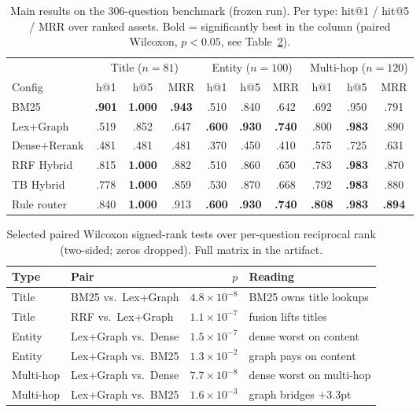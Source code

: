\documentclass[runningheads]{llncs}
\newcommand{\best}[1]{\textbf{#1}}
\begin{document}
\begin{table}[t]
\caption{Main results on the 306-question benchmark (frozen run). Per type:
hit@1 / hit@5 / MRR over ranked assets. Bold = significantly best in the
column (paired Wilcoxon, $p<0.05$, see Table~\ref{tab:sig}).}
\label{tab:main}
\centering
\footnotesize
\setlength{\tabcolsep}{3.2pt}
\begin{tabular}{l ccc ccc ccc}
\toprule
& \multicolumn{3}{c}{Title ($n{=}81$)} & \multicolumn{3}{c}{Entity ($n{=}100$)} & \multicolumn{3}{c}{Multi-hop ($n{=}120$)} \\
\cmidrule(lr){2-4}\cmidrule(lr){5-7}\cmidrule(lr){8-10}
Config & h@1 & h@5 & MRR & h@1 & h@5 & MRR & h@1 & h@5 & MRR \\
\midrule
BM25 & \best{.901} & \best{1.000} & \best{.943} & .510 & .840 & .642 & .692 & .950 & .791 \\
Lex+Graph & .519 & .852 & .647 & \best{.600} & \best{.930} & \best{.740} & .800 & \best{.983} & .890 \\
Dense+Rerank & .481 & .481 & .481 & .370 & .450 & .410 & .575 & .725 & .631 \\
RRF Hybrid & .815 & \best{1.000} & .882 & .510 & .860 & .650 & .783 & \best{.983} & .870 \\
TB Hybrid & .778 & \best{1.000} & .859 & .530 & .870 & .668 & .792 & \best{.983} & .880 \\
Rule router & .840 & \best{1.000} & .913 & \best{.600} & \best{.930} & \best{.740} & \best{.808} & \best{.983} & \best{.894} \\
\bottomrule
\end{tabular}
\end{table}

\begin{table}[t]
\caption{Selected paired Wilcoxon signed-rank tests over per-question
reciprocal rank (two-sided; zeros dropped). Full matrix in the artifact.}
\label{tab:sig}
\centering
\footnotesize
\setlength{\tabcolsep}{2.5pt}
\begin{tabular}{llrl}
\toprule
Type & Pair & $p$ & Reading \\
\midrule
Title & BM25 vs.\ Lex+Graph & $4.8{\times}10^{-8}$ & BM25 owns title lookups \\
Title & RRF vs.\ Lex+Graph & $1.1{\times}10^{-7}$ & fusion lifts titles \\
Entity & Lex+Graph vs.\ Dense & $1.5{\times}10^{-7}$ & dense worst on content \\
Entity & Lex+Graph vs.\ BM25 & $1.3{\times}10^{-2}$ & graph pays on content \\
Multi-hop & Lex+Graph vs.\ Dense & $7.7{\times}10^{-8}$ & dense worst on multi-hop \\
Multi-hop & Lex+Graph vs.\ BM25 & $1.6{\times}10^{-3}$ & graph bridges $+3.3$pt \\
\bottomrule
\end{tabular}
\end{table}
\end{document}

